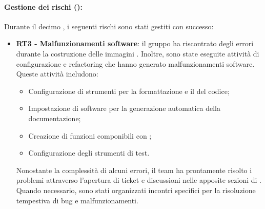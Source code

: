 \paragraph*{Gestione dei rischi ():}
\par Durante il decimo , i seguenti rischi sono stati gestiti con successo:
\begin{itemize}
  \item \textbf{RT3 - Malfunzionamenti software}: il gruppo ha riscontrato degli errori durante la costruzione delle immagini . Inoltre, sono state eseguite attività di configurazione e refactoring che hanno generato malfunzionamenti software. Queste attività includono:
  \begin{itemize}
    \item Configurazione di strumenti per la formattazione e il  del codice;
    \item Impostazione di software per la generazione automatica della documentazione;
    \item Creazione di funzioni componibili con ;
    \item Configurazione degli strumenti di test.
  \end{itemize}
  Nonostante la complessità di alcuni errori, il team ha prontamente risolto i problemi attraverso l'apertura di ticket e discussioni nelle apposite sezioni di . Quando necessario, sono stati organizzati incontri specifici per la risoluzione tempestiva di bug e malfunzionamenti.
\end{itemize}